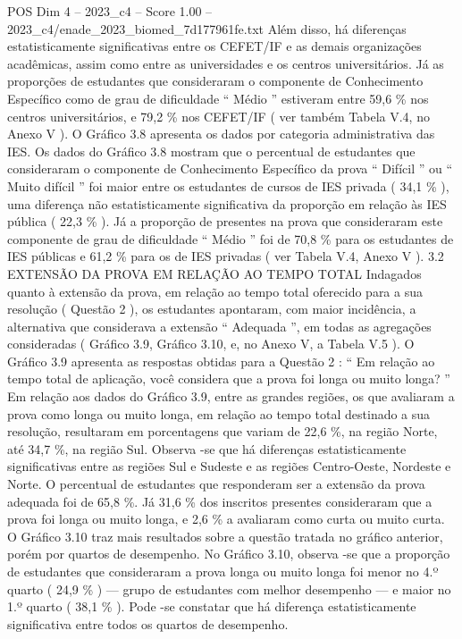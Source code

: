 \begin{textsample}{POS Dim 4 – 2023\_c4 – Score 1.00 – 2023\_c4/enade\_2023\_biomed\_7d177961fe.txt}
Além disso, há diferenças estatisticamente significativas entre os CEFET/IF e as demais organizações acadêmicas, assim como entre as universidades e os centros universitários.
Já as proporções de estudantes que consideraram o componente de Conhecimento Específico como de grau de dificuldade “ Médio ” estiveram entre 59,6 \% nos centros universitários, e 79,2 \% nos CEFET/IF ( ver também Tabela V.4, no Anexo V ).
O Gráfico 3.8 apresenta os dados por categoria administrativa das IES.
Os dados do Gráfico 3.8 mostram que o percentual de estudantes que consideraram o componente de Conhecimento Específico da prova “ Difícil ” ou “ Muito difícil ” foi maior entre os estudantes de cursos de IES privada ( 34,1 \% ), uma diferença não estatisticamente significativa da proporção em relação às IES pública ( 22,3 \% ).
Já a proporção de presentes na prova que consideraram este componente de grau de dificuldade “ Médio ” foi de 70,8 \% para os estudantes de IES públicas e 61,2 \% para os de IES privadas ( ver Tabela V.4, Anexo V ). 3.2 EXTENSÃO DA PROVA EM RELAÇÃO AO TEMPO TOTAL Indagados quanto à extensão da prova, em relação ao tempo total oferecido para a sua resolução ( Questão 2 ), os estudantes apontaram, com maior incidência, a alternativa que considerava a extensão “ Adequada ”, em todas as agregações consideradas ( Gráfico 3.9, Gráfico 3.10, e, no Anexo V, a Tabela V.5 ).
O Gráfico 3.9 apresenta as respostas obtidas para a Questão 2 : “ Em relação ao tempo total de aplicação, você considera que a prova foi longa ou muito longa? ” Em relação aos dados do Gráfico 3.9, entre as grandes regiões, os que avaliaram a prova como longa ou muito longa, em relação ao tempo total destinado a sua resolução, resultaram em porcentagens que variam de 22,6 \%, na região Norte, até 34,7 \%, na região Sul.
Observa -se que há diferenças estatisticamente significativas entre as regiões Sul e Sudeste e as regiões Centro-Oeste, Nordeste e Norte.
O percentual de estudantes que responderam ser a extensão da prova adequada foi de 65,8 \%.
Já 31,6 \% dos inscritos presentes consideraram que a prova foi longa ou muito longa, e 2,6 \% a avaliaram como curta ou muito curta.
O Gráfico 3.10 traz mais resultados sobre a questão tratada no gráfico anterior, porém por quartos de desempenho.
No Gráfico 3.10, observa -se que a proporção de estudantes que consideraram a prova longa ou muito longa foi menor no 4.º quarto ( 24,9 \% ) — grupo de estudantes com melhor desempenho — e maior no 1.º quarto ( 38,1 \% ).
Pode -se constatar que há diferença estatisticamente significativa entre todos os quartos de desempenho.

\end{textsample}
